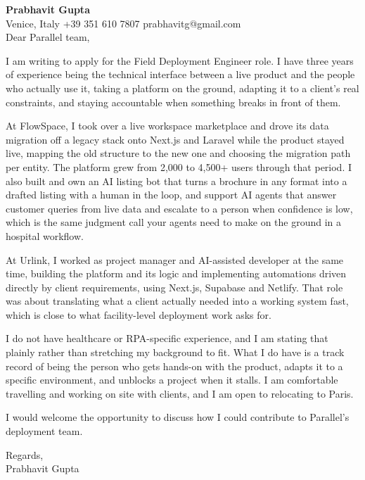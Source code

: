 \documentclass[a4paper,10.5pt]{article}
\begin{document}
\textbf{Prabhavit Gupta}\\
Venice, Italy \textbar{} +39 351 610 7807 \textbar{} prabhavitg@gmail.com\\[10pt]
Dear Parallel team,

I am writing to apply for the Field Deployment Engineer role. I have three years of experience being the technical interface between a live product and the people who actually use it, taking a platform on the ground, adapting it to a client's real constraints, and staying accountable when something breaks in front of them.

At FlowSpace, I took over a live workspace marketplace and drove its data migration off a legacy stack onto Next.js and Laravel while the product stayed live, mapping the old structure to the new one and choosing the migration path per entity. The platform grew from 2,000 to 4,500+ users through that period. I also built and own an AI listing bot that turns a brochure in any format into a drafted listing with a human in the loop, and support AI agents that answer customer queries from live data and escalate to a person when confidence is low, which is the same judgment call your agents need to make on the ground in a hospital workflow.

At Urlink, I worked as project manager and AI-assisted developer at the same time, building the platform and its logic and implementing automations driven directly by client requirements, using Next.js, Supabase and Netlify. That role was about translating what a client actually needed into a working system fast, which is close to what facility-level deployment work asks for.

I do not have healthcare or RPA-specific experience, and I am stating that plainly rather than stretching my background to fit. What I do have is a track record of being the person who gets hands-on with the product, adapts it to a specific environment, and unblocks a project when it stalls. I am comfortable travelling and working on site with clients, and I am open to relocating to Paris.

I would welcome the opportunity to discuss how I could contribute to Parallel's deployment team.

Regards,\\
Prabhavit Gupta
\end{document}
